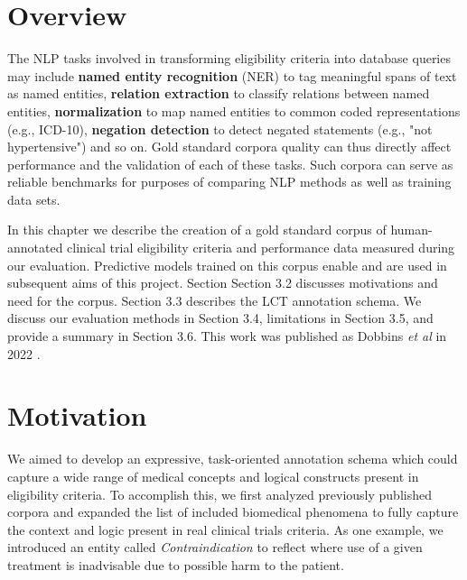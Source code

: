 \documentclass[../main.tex]{subfiles}
\begin{document}
\section{Overview}

The NLP tasks involved in transforming eligibility criteria into database queries may include \textbf{named entity recognition} (NER) to tag meaningful spans of text as named entities, \textbf{relation extraction} to classify relations between named entities, \textbf{normalization} to map named entities to common coded representations (e.g., ICD-10), \textbf{negation detection} to detect negated statements (e.g., "not hypertensive") and so on. Gold standard corpora quality can thus directly affect performance and the validation of each of these tasks. Such corpora can serve as reliable benchmarks for purposes of comparing NLP methods as well as training data sets. 

In this chapter we describe the creation of a gold standard corpus of human-annotated clinical trial eligibility criteria and performance data measured during our evaluation. Predictive models trained on this corpus enable and are used in subsequent aims of this project. Section Section 3.2 discusses motivations and need for the corpus. Section 3.3 describes the LCT annotation schema. We discuss our evaluation methods in Section 3.4, limitations in Section 3.5, and provide a summary in Section 3.6. This work was published as Dobbins \textit{et al} in 2022 \cite{dobbins2022leaf}.

\section{Motivation}

We aimed to develop an expressive, task-oriented annotation schema which could capture a wide range of medical concepts and logical constructs present in eligibility criteria. To accomplish this, we first analyzed previously published corpora \cite{weng2011elixr,boland2012elixrtime,kang2017eliie,kury2020chia} and expanded the list of included biomedical phenomena to fully capture the context and logic present in real clinical trials criteria. As one example, we introduced an entity called \textit{Contraindication} to reflect where use of a given treatment is inadvisable due to possible harm to the patient. 
\end{document}
